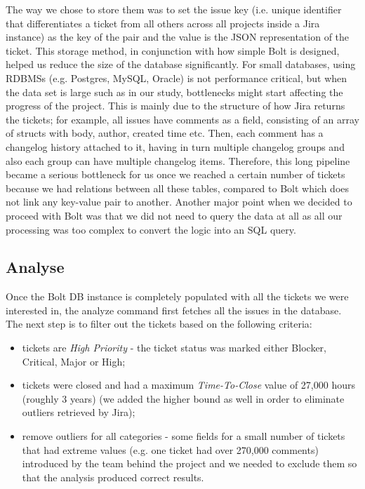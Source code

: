 \documentclass{mpaper}
\begin{document}
The way we chose to store them was to set the issue key (i.e. unique identifier that differentiates a ticket from all others across all 
projects inside a Jira instance) as the key of the pair and the value is the JSON representation of the ticket. This storage method, in conjunction
with how simple Bolt is designed, helped us reduce the size of the database significantly. For small databases, 
using RDBMSs (e.g. Postgres, MySQL, Oracle) is not performance critical, but when the data set is large such as in our study, bottlenecks might start affecting 
the progress of the project. This is mainly due to the structure of how Jira returns the tickets; for example, all issues have comments as 
a field, consisting of an array of structs with body, author, created time etc. Then, each comment has a changelog history attached to it, 
having in turn multiple changelog groups and also each group can have multiple changelog items. Therefore, this long pipeline became a serious 
bottleneck for us once we reached a certain number of tickets because we had relations between all these tables, compared to Bolt which does not 
link any key-value pair to another. Another major point when we decided to proceed with Bolt was that we did not need to query the data at all 
as all our processing was too complex to convert the logic into an SQL query.

\subsection{Analyse}

Once the Bolt DB instance is completely populated with all the tickets we were interested in, the analyze command first 
fetches all the issues in the database. The next step is to filter out the tickets based on the following criteria:
\begin{itemize}
  \item tickets are \emph{High Priority} - the ticket status was marked either Blocker, Critical, Major or High;
  \item tickets were closed and had a maximum \emph{Time-To-Close} value of 27,000 hours (roughly 3 years) (we added the 
  higher bound as well in order to eliminate outliers retrieved by Jira);
  \item remove outliers for all categories - some fields for a small number of tickets that had extreme values (e.g. one ticket
  had over 270,000 comments) introduced by the team behind the project and we needed to exclude them so that the analysis 
  produced correct results.
\end{itemize}
\end{document}
